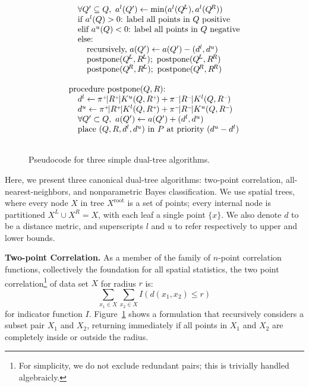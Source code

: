 \documentclass{article}
\newcommand{\fig}[1]{Figure~\ref{fig:#1}}
\newcommand{\spos}{^{{\scriptscriptstyle +\!}}}
\newcommand{\sneg}{^{{\scriptscriptstyle -\!}}}
\newcommand{\kdroot}[1]{#1^{\!\text{root}}}
\newcommand{\kdleft}[1]{#1^{\!L}}
\newcommand{\kdright}[1]{#1^{\!R}}
\newcommand{\al}{a^l}
\newcommand{\au}{a^u}
\newcommand{\dl}{d^l}
\newcommand{\du}{d^u}
\newcommand{\x}{\\ \hspace{0.15in}}
\newcommand{\xx}{\\ \hspace{0.3in}}
\begin{document}
\begin{figure}
\begin{displaymath}
\begin{array}{ll}
\begin{array}{l}
        \x \forall Q' \subseteq Q,~ \al(Q') \gets \min(\al(\kdleft{Q}), \al(\kdright{Q}))
        \x \text{if }\al(Q) > 0\text{: label all points in }Q\text{ positive}
        \x \text{elif }\au(Q) < 0\text{: label all points in }Q\text{ negative}
        \x \text{else:}
        \xx \text{recursively, }a(Q') \gets a(Q') - (\dl, \du)
        \xx \text{postpone}(\kdleft{Q}, \kdleft{R}); \text{ postpone}(\kdleft{Q}, \kdright{R})
        \xx \text{postpone}(\kdright{Q}, \kdleft{R}); \text{ postpone}(\kdright{Q}, \kdright{R})
        \\
        \\ \text{procedure postpone}(Q, R)\text{:}
        \x \dl \gets \pi\spos|R\spos|K^{u}(Q, R\spos) + \pi\sneg|R\sneg|K^{l}(Q, R\sneg)
        \x \du \gets \pi\spos|R\spos|K^{l}(Q, R\spos) + \pi\sneg|R\sneg|K^{u}(Q, R\sneg)
        \x \forall Q' \subset Q,~ a(Q') \gets a(Q') + (\dl, \du)
        \x \text{place }(Q, R, \dl, \du)\text{ in }P\text{ at priority }(\du-\dl)
        \\
        \\
      \end{array}
    \end{array}
    \vspace{-0.2in}
  \end{displaymath}
  \label{fig:allnntpc}
  \caption{Pseudocode for three simple dual-tree algorithms.}
\end{figure}

Here, we present three canonical dual-tree algorithms: two-point correlation, all-nearest-neighbors, and nonparametric Bayes classification.
We use spatial trees, where every node $X$ in tree $\kdroot{X}$ is a set of points; every internal node is partitioned $\kdleft{X} \cup \kdright{X} = X$, with each leaf a single point $\{x\}$.
We also denote $d$ to be a distance metric, and superscripts $l$ and $u$ to refer respectively to upper and lower bounds.

{\bf Two-point Correlation.} As a member of the family of $n$-point correlation functions, collectively the foundation for all spatial statistics, the two point correlation\footnote{For simplicity, we do not exclude redundant pairs; this is trivially handled algebraicly.} of data set $X$ for radius $r$ is:
\begin{equation*}
\sum_{x_1 \in X} \sum_{x_2 \in X} I(d(x_1, x_2) \leq r)
\end{equation*}
\noindent for indicator function $I$.
\fig{allnntpc} shows a formulation that recursively considers a subset pair $X_1$ and $X_2$, returning immediately if all points in $X_1$ and $X_2$ are completely inside or outside the radius.
\end{document}

